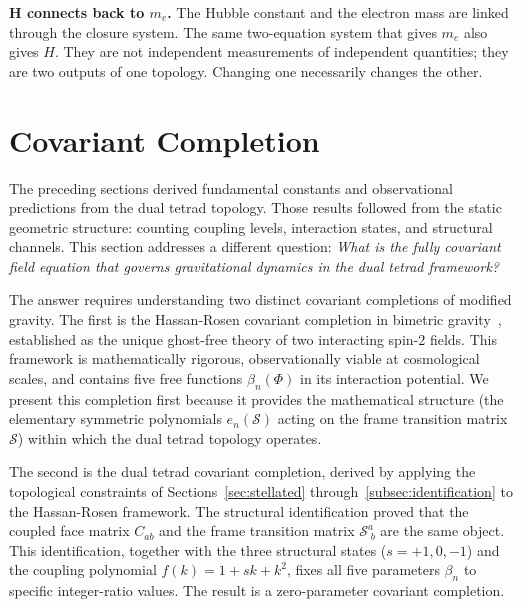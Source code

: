 \documentclass[aps,prd,preprint,superscriptaddress,showpacs,preprintnumbers,amsmath,amssymb,nofootinbib]{revtex4-2}
\begin{document}
\textbf{H connects back to $m_e$.} The Hubble constant and the electron mass are linked through the closure system. The same two-equation system that gives $m_e$ also gives $H$. They are not independent measurements of independent quantities; they are two outputs of one topology. Changing one necessarily changes the other.

\section{Covariant Completion}
\label{sec:covariant}

The preceding sections derived fundamental constants and observational predictions from the dual tetrad topology. Those results followed from the static geometric structure: counting coupling levels, interaction states, and structural channels. This section addresses a different question: \emph{What is the fully covariant field equation that governs gravitational dynamics in the dual tetrad framework?}

The answer requires understanding two distinct covariant completions of modified gravity. The first is the Hassan-Rosen covariant completion in bimetric gravity~\cite{hassan2012}, established as the unique ghost-free theory of two interacting spin-2 fields. This framework is mathematically rigorous, observationally viable at cosmological scales, and contains five free functions $\beta_n(\Phi)$ in its interaction potential. We present this completion first because it provides the mathematical structure (the elementary symmetric polynomials $e_n(\mathcal{S})$ acting on the frame transition matrix $\mathcal{S}$) within which the dual tetrad topology operates.

The second is the dual tetrad covariant completion, derived by applying the topological constraints of Sections~\ref{sec:stellated} through~\ref{subsec:identification} to the Hassan-Rosen framework. The structural identification proved that the coupled face matrix $C_{ab}$ and the frame transition matrix $\mathcal{S}^a_{\;b}$ are the same object. This identification, together with the three structural states ($s = +1, 0, -1$) and the coupling polynomial $f(k) = 1 + sk + k^2$, fixes all five parameters $\beta_n$ to specific integer-ratio values. The result is a zero-parameter covariant completion.
\end{document}
